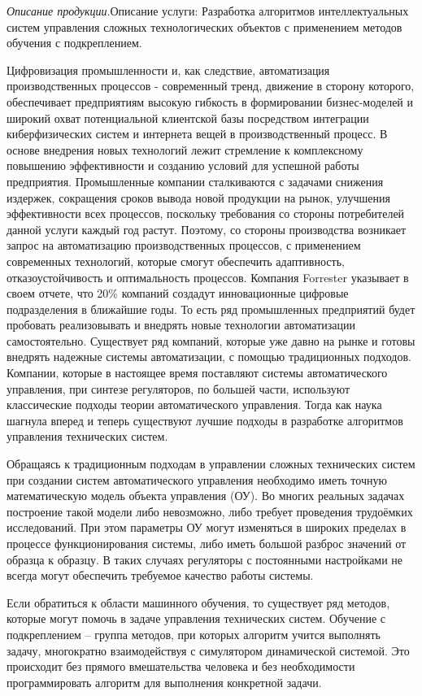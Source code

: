 \textit{Описание продукции}.Описание услуги: Разработка алгоритмов интеллектуальных систем управления сложных технологических объектов с применением методов обучения с подкреплением.

Цифровизация промышленности и, как следствие, автоматизация производственных процессов - современный тренд, движение в сторону которого, обеспечивает предприятиям высокую гибкость в формировании бизнес-моделей и широкий охват потенциальной клиентской базы посредством интеграции киберфизических систем и интернета вещей в производственный процесс. В основе внедрения новых технологий лежит стремление к комплексному повышению эффективности и созданию условий для успешной работы предприятия. Промышленные компании сталкиваются с задачами снижения издержек, сокращения сроков вывода новой продукции на рынок, улучшения эффективности всех процессов, поскольку требования со стороны потребителей данной услуги каждый год растут.
Поэтому, со стороны производства возникает запрос на автоматизацию производственных процессов, с применением современных технологий, которые смогут обеспечить адаптивность, отказоустойчивость и оптимальность процессов. 
Компания Forrester указывает в своем отчете, что 20\% компаний создадут инновационные цифровые подразделения в ближайшие годы. То есть ряд промышленных предприятий будет пробовать реализовывать и внедрять новые технологии автоматизации самостоятельно. Существует ряд компаний, которые уже давно на рынке и готовы внедрять надежные системы автоматизации, с помощью традиционных подходов. 
Компании, которые в настоящее время поставляют системы автоматического управления, при синтезе регуляторов, по большей части, используют классические подходы теории автоматического управления. Тогда как наука шагнула вперед и теперь существуют лучшие подходы в разработке алгоритмов управления технических систем.

Обращаясь к традиционным подходам в управлении сложных технических систем при создании систем автоматического управления необходимо иметь точную математическую модель объекта управления (ОУ). Во многих реальных задачах построение такой модели либо невозможно, либо требует проведения трудоёмких исследований. При этом параметры ОУ могут изменяться в широких пределах в процессе функционирования системы, либо иметь большой разброс значений от образца к образцу. В таких случаях регуляторы с постоянными настройками не всегда могут обеспечить требуемое качество работы системы. 

Если обратиться к области машинного обучения, то существует ряд методов, которые могут помочь в задаче управления технических систем. Обучение с подкреплением -- группа методов, при которых алгоритм учится выполнять задачу, многократно взаимодействуя с симулятором динамической системой. Это происходит без прямого вмешательства человека и без необходимости программировать алгоритм для выполнения конкретной задачи.

